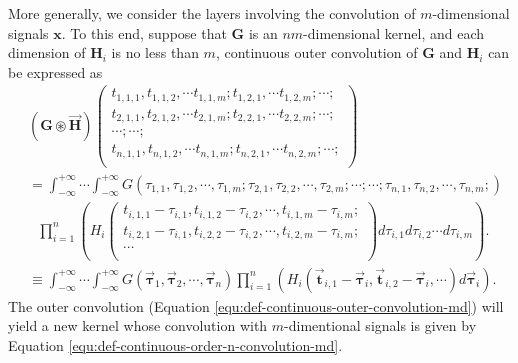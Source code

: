 \documentclass[twoside,11pt]{article}
\def\oconv{\circledast}
\def\tvar#1{\mathbf{#1}} %
\def\vsymb#1{\vec{\mathbf{#1}}}
\def\isintinf{\int_{-\infty}^{+\infty}\!\!\!\cdots\!\int_{-\infty}^{+\infty}\!}
\begin{document}
More generally, we consider the layers involving the convolution of $m$-dimensional signals $\tvar{x}$. To this end, suppose that \(\tvar{G}\) is an \(nm\)-dimensional kernel, and each dimension of \(\tvar{H}_i\) is no less than $m$, continuous outer convolution of $\tvar{G}$ and $\tvar{H}_i$ can be expressed as
\begin{equation}
  \begin{aligned}
     & \left(\tvar{G} \oconv \vsymb{H}\right)\left(\begin{array}{c}
        t_{1,1,1}, t_{1,1,2}, \cdots t_{1,1,m};
        t_{1,2,1}, \cdots t_{1,2,m}; \cdots; \\
        t_{2,1,1}, t_{2,1,2}, \cdots t_{2,1,m};
        t_{2,2,1}, \cdots t_{2,2,m}; \cdots; \\
        \cdots; \cdots;                      \\
        t_{n,1,1}, t_{n,1,2}, \cdots t_{n,1,m};
        t_{n,2,1}, \cdots t_{n,2,m}; \cdots; \\
      \end{array}\right) \\
     & = \isintinf \!\!G \left(
    \tau_{1,1}, \tau_{1,2}, \cdots, \tau_{1,m};
    \tau_{2,1}, \tau_{2,2}, \cdots, \tau_{2,m};
    \cdots; \cdots;
    \tau_{n,1}, \tau_{n,2}, \cdots, \tau_{n,m};
    \right)                                                                          \\
     & ~~~
    \prod_{i=1}^{n} \left(
    H_i \left(\begin{array}{c}
          t_{i,1,1} - \tau_{i,1}, t_{i,1,2} - \tau_{i,2}, \cdots, t_{i,1,m} - \tau_{i,m}; \\
          t_{i,2,1} - \tau_{i,1}, t_{i,2,2} - \tau_{i,2}, \cdots, t_{i,2,m} - \tau_{i,m}; \\
          \cdots                                                                          \\
        \end{array} \right)
    d \tau_{i,1} d \tau_{i,2} \cdots d \tau_{i,m}
    \right).                                                                         \\
     & \equiv \isintinf G(\vsymb{\tau}_1, \vsymb{\tau}_2, \cdots, \vsymb{\tau}_n)
    \prod_{i=1}^{n} \left(
    H_i (\vsymb{t}_{i,1} - \vsymb{\tau}_i, \vsymb{t}_{i,2} - \vsymb{\tau}_i, \cdots ) d \vsymb{\tau}_i
    \right).
  \end{aligned}
  \label{equ:def-continuous-outer-convolution-md}
\end{equation}
The outer convolution (Equation \ref{equ:def-continuous-outer-convolution-md}) will yield a new kernel whose convolution with $m$-dimentional signals is given by Equation \ref{equ:def-continuous-order-n-convolution-md}.
\end{document}
